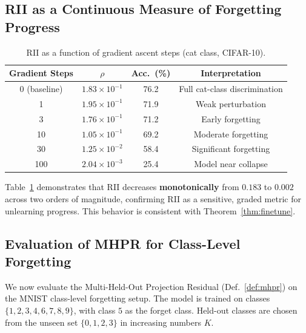 \documentclass[journal]{IEEEtran}
\theoremstyle{definition}
\begin{document}
\subsection{RII as a Continuous Measure of Forgetting Progress}
\label{sec:gradient_sweep}

\begin{table}[t]
\centering
\caption{RII as a function of gradient ascent steps (cat class, CIFAR-10).}\label{tab:gradient_sweep}
\setlength{\tabcolsep}{3pt}
\begin{tabular}{c c c c}
\toprule
Gradient Steps & $\rho$ & Acc.\ (\%) & Interpretation \\
\midrule
0 (baseline) & $1.83{\times}10^{-1}$ & 76.2 & Full cat-class discrimination \\
1            & $1.95{\times}10^{-1}$ & 71.9 & Weak perturbation \\
3            & $1.76{\times}10^{-1}$ & 71.2 & Early forgetting \\
10           & $1.05{\times}10^{-1}$ & 69.2 & Moderate forgetting \\
30           & $1.25{\times}10^{-2}$ & 58.4 & Significant forgetting \\
100          & $2.04{\times}10^{-3}$ & 25.4 & Model near collapse \\
\bottomrule
\end{tabular}
\end{table}

Table~\ref{tab:gradient_sweep} demonstrates that RII decreases \textbf{monotonically} from $0.183$ to $0.002$ across two orders of magnitude, confirming RII as a sensitive, graded metric for unlearning progress. This behavior is consistent with Theorem~\ref{thm:finetune}.

\subsection{Evaluation of MHPR for Class-Level Forgetting}
\label{sec:mhpr_eval}

We now evaluate the Multi-Held-Out Projection Residual (Def.~\ref{def:mhpr}) on the MNIST class-level forgetting setup. The model is trained on classes $\{1,2,3,4,6,7,8,9\}$, with class $5$ as the forget class. Held-out classes are chosen from the unseen set $\{0,1,2,3\}$ in increasing numbers $K$.
\end{document}
